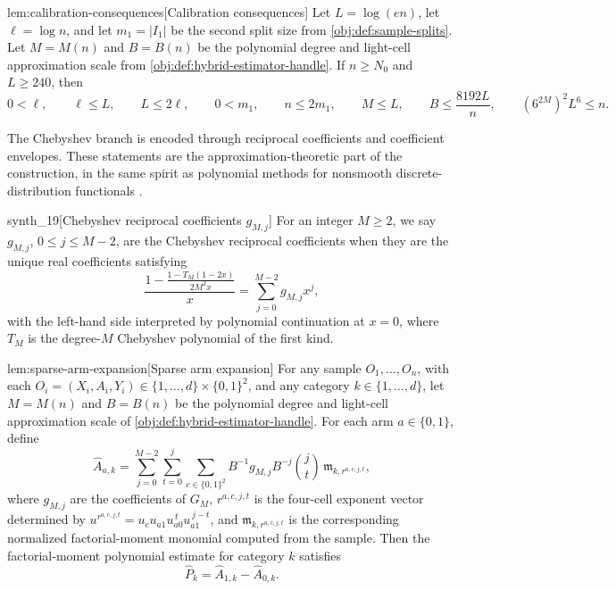 \begin{lemmav}{lem:calibration-consequences}[Calibration consequences]
Let \(L=\log(en)\), let \(\ell=\log n\), and let \(m_1=|I_1|\) be the second split size from \cref{obj:def:sample-splits}. Let \(M=M(n)\) and \(B=B(n)\) be the polynomial degree and light-cell approximation scale from \cref{obj:def:hybrid-estimator-handle}. If \(n\ge N_0\) and \(L\ge240\), then
\[
0<\ell,\qquad
\ell\le L,\qquad
L\le2\ell,\qquad
0<m_1,\qquad
n\le2m_1,\qquad
M\le L,\qquad
B\le\frac{8192L}{n},\qquad
(6^{2M})^2L^6\le n .
\]
\end{lemmav}

The Chebyshev branch is encoded through reciprocal coefficients and coefficient envelopes. These statements are the approximation-theoretic part of the construction, in the same spirit as polynomial methods for nonsmooth discrete-distribution functionals \citep{JiaoVenkatHanWeissman2015,WuYang2016,HanJiaoWeissman2020}.

\begin{definitionv}{synth_19}[Chebyshev reciprocal coefficients \(g_{M,j}\)]
For an integer \(M\ge2\), we say \(g_{M,j}\), \(0\le j\le M-2\), are the Chebyshev reciprocal coefficients when they are the unique real coefficients satisfying \[\frac{1-\frac{1-T_M(1-2x)}{2M^2x}}{x}=\sum_{j=0}^{M-2}g_{M,j}x^j,\] with the left-hand side interpreted by polynomial continuation at \(x=0\), where \(T_M\) is the degree-\(M\) Chebyshev polynomial of the first kind.
\end{definitionv}

\begin{lemmav}{lem:sparse-arm-expansion}[Sparse arm expansion]
For any sample \(O_1,\ldots,O_n\), with each \(O_i=(X_i,A_i,Y_i)\in\{1,\ldots,d\}\times\{0,1\}^2\), and any category \(k\in\{1,\ldots,d\}\), let \(M=M(n)\) and \(B=B(n)\) be the polynomial degree and light-cell approximation scale of \cref{obj:def:hybrid-estimator-handle}.  For each arm \(a\in\{0,1\}\), define
\[
\widehat A_{a,k}
=
\sum_{j=0}^{M-2}\sum_{t=0}^{j}\sum_{c\in\{0,1\}^2}
B^{-1} g_{M,j} B^{-j}\binom jt\,
\mathfrak m_{k,r^{a,c,j,t}},
\]
where \(g_{M,j}\) are the coefficients of \(G_M\), \(r^{a,c,j,t}\) is the four-cell exponent vector determined by
\(u^{r^{a,c,j,t}}=u_cu_{a1}u_{a0}^{\,t}u_{a1}^{\,j-t}\), and \(\mathfrak m_{k,r^{a,c,j,t}}\) is the corresponding normalized factorial-moment monomial computed from the sample.  Then the factorial-moment polynomial estimate for category \(k\) satisfies
\[
\widehat P_k=\widehat A_{1,k}-\widehat A_{0,k}.
\]
\end{lemmav}

